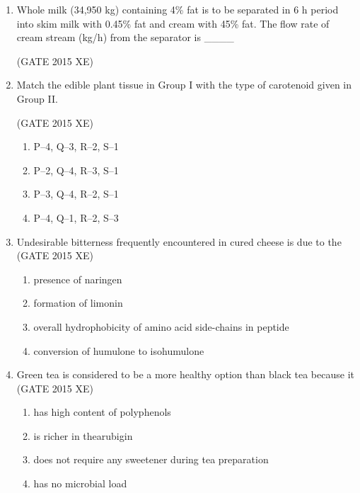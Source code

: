 \documentclass[journal,12pt,onecolumn]{IEEEtran}
\begin{document}
\begin{enumerate}
\item Whole milk (34,950 kg) containing 4\% fat is to be separated in 6 h period into skim milk with 0.45\% fat and cream with 45\% fat. The flow rate of cream stream (kg/h) from the separator is \_\_\_\_

\hfill{(GATE 2015 XE)} \\


\item Match the edible plant tissue in Group I with the type of carotenoid given in Group II.



\hfill{(GATE 2015 XE)} \\
\begin{multicols}{2}
\begin{enumerate}
\item P–4, Q–3, R–2, S–1
\item P–2, Q–4, R–3, S–1
\item P–3, Q–4, R–2, S–1
\item P–4, Q–1, R–2, S–3
\end{enumerate}
\end{multicols}

\item Undesirable bitterness frequently encountered in cured cheese is due to the\\
\hfill{(GATE 2015 XE)} 
\begin{multicols}{4}
\begin{enumerate}
\item presence of naringen
\item formation of limonin
\item overall hydrophobicity of amino acid side-chains in peptide
\item conversion of humulone to isohumulone
\end{enumerate}
\end{multicols}

\newpage 

\item Green tea is considered to be a more healthy option than black tea because it\\
\hfill{(GATE 2015 XE)} 
\begin{multicols}{2}
\begin{enumerate}
\item has high content of polyphenols
\item is richer in thearubigin
\item does not require any sweetener during tea preparation
\item has no microbial load
\end{enumerate}
\end{multicols}


\end{enumerate}
\end{document}
